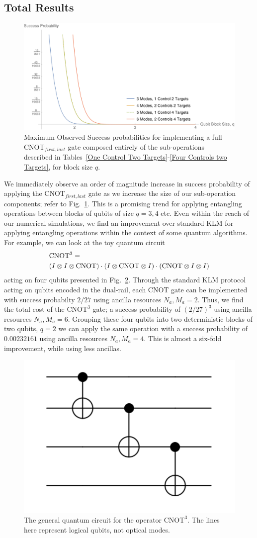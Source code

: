 \documentclass[aps,pra,twocolumn,showpacs,superscriptaddress,floatfix,10pt]{revtex4}
\begin{document}
 \subsection{Total Results}
 \begin{figure}[H]
 	\centering
 	\includegraphics[width=0.5 \textwidth]{./blockencodingresults.pdf}
 	\caption{Maximum Observed Success probabilities for implementing a full $\mbox{CNOT}_{first,last}$ gate composed entirely of the sub-operations described in Tables~\ref{One Control Two Targets}-\ref{Four Controls two Targets}, for block size $q$.}
 	\label{Figure - Block Encoding Results}
 \end{figure}
 We immediately observe an order of magnitude increase in success probability of applying the $\mbox{CNOT}_{first,last}$ gate as we increase the size of our sub-operation components; refer to Fig.~\ref{Figure - Block Encoding Results}. This is a promising trend for applying entangling operations between blocks of qubits of size $q=3,4$ etc. Even within the reach of our numerical simulations, we find an improvement over standard KLM for applying entangling operations within the context of some quantum algorithms. For example, we can look at the toy quantum circuit 
 \begin{eqnarray}
 \small & \mbox{CNOT}^3 = \\ \small \nonumber & (I \otimes I \otimes \mbox{CNOT}) \cdot (I \otimes  \mbox{CNOT} \otimes I) \cdot (\mbox{CNOT} \otimes I \otimes I)
 \end{eqnarray}
 acting on four qubits presented in Fig.~\ref{Three CNOTs}. Through the standard KLM protocol acting on qubits encoded in the dual-rail, each CNOT gate can be implemented with success probabilty $2/27$ using ancilla resources $N_a,M_a=2$. Thus, we find the total cost of the $\mbox{CNOT}^3$ gate; a success probability of $(2/27)^3$ using ancilla resources $ N_a,M_a = 6 $. Grouping these four qubits into two deterministic blocks of two qubits, $q=2$ we can apply the same operation with a success probability of $0.00232161$ using ancilla resources $ N_a,M_a=4 $. This is almost a six-fold improvement, while using less ancillas.
 \begin{figure}[ht]
 	\centering
 	\includegraphics[width=0.25 \textwidth]{./ThreeCNOTs.pdf}
 	\caption{The general quantum circuit for the operator $\mbox{CNOT}^3$. The lines here represent logical qubits, not optical modes.}
 	\label{Three CNOTs}
 \end{figure}
\end{document}
